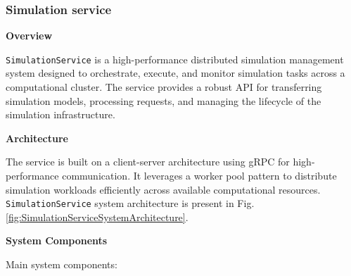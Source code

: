 \subsubsection{Simulation service}
\textbf{Overview}

\texttt{SimulationService} is a high-performance distributed simulation management system designed to orchestrate, execute, and monitor simulation tasks across a computational cluster. The service provides a robust API for transferring simulation models, processing requests, and managing the lifecycle of the simulation infrastructure.

\bigskip
\textbf{Architecture}

The service is built on a client-server architecture using gRPC for high-performance communication. It leverages a worker pool pattern to distribute simulation workloads efficiently across available computational resources. \texttt{SimulationService} system architecture is present in Fig. \ref{fig:SimulationServiceSystemArchitecture}.

\bigskip
\textbf{System Components}

\bigskip
Main system components:

